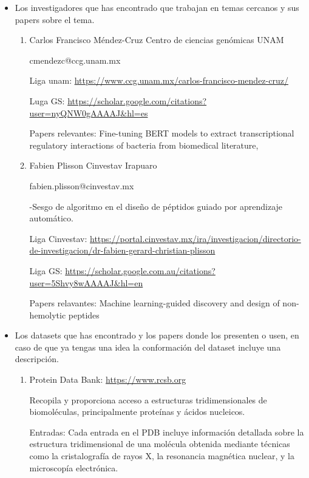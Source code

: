 \documentclass[11pt, twoside]{report}
\begin{document}
\begin{itemize}
    \item Los investigadores que has encontrado que trabajan en temas cercanos y sus papers sobre el tema.
    
    \begin{enumerate}
        \item Carlos Francisco Méndez-Cruz Centro de ciencias genómicas UNAM
        
        cmendezc@ccg.unam.mx
        
        Liga unam: \url{https://www.ccg.unam.mx/carlos-francisco-mendez-cruz/}

        Luga GS: \url{https://scholar.google.com/citations?user=nyQNW0gAAAAJ&hl=es}

        Papers relevantes: Fine-tuning BERT models to extract transcriptional regulatory interactions of bacteria from biomedical literature,


        \item Fabien Plisson Cinvestav Irapuaro 
        
        fabien.plisson@cinvestav.mx

        -Sesgo de algoritmo en el diseño de péptidos guiado por aprendizaje automático.

        Liga Cinvestav: \url{https://portal.cinvestav.mx/ira/investigacion/directorio-de-investigacion/dr-fabien-gerard-christian-plisson}

        Liga GS: \url{https://scholar.google.com.au/citations?user=5Shvy8wAAAAJ&hl=en}

        Papers relavantes: Machine learning-guided discovery and design of non-hemolytic peptides

    \end{enumerate}

    \item Los datasets que has encontrado y los papers donde los presenten o usen, en caso de que ya tengas una idea la conformación del dataset incluye una descripción.
    
    \begin{enumerate}
        \item Protein Data Bank: \url{https://www.rcsb.org }
        
        Recopila y proporciona acceso a estructuras tridimensionales de biomoléculas, principalmente proteínas y ácidos nucleicos.

        Entradas: Cada entrada en el PDB incluye información detallada sobre la estructura tridimensional de una molécula obtenida mediante técnicas como la cristalografía de rayos X, la resonancia magnética nuclear, y la microscopía electrónica.



\end{enumerate}
\end{itemize}
\end{document}
